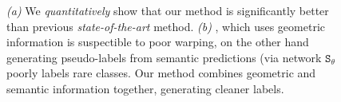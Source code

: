 \begin{figure}[t]
\begin{center}
{\begin{minipage}{0.35\textwidth}
\end{minipage}
}
\end{center}
\vspace{-1em}
\caption{\small \emph{(a)} We \textit{quantitatively} show that our method is significantly better than previous \textit{state-of-the-art} method. \emph{(b)} \cite{nvidia_cvpr19}, which uses geometric information is suspectible to poor warping, on the other hand generating pseudo-labels from semantic predictions (via network $\mathtt{S}_\theta$ poorly labels rare classes. Our method combines geometric and semantic information together, generating cleaner labels.}
\label{table:svhn}

		\vspace{-1em}
\end{figure}
